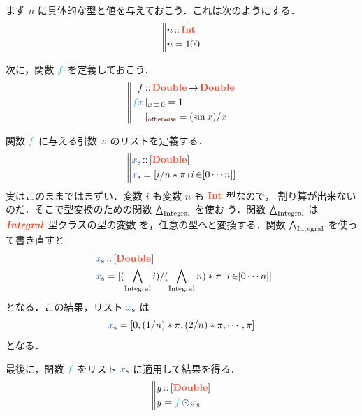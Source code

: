 \documentclass[a5paper,twoside,fleqn,draft]{jsbook}
\begin{document}
まず $n$ に具体的な型と値を与えておこう．これは次のようにする．
\begin{equation}
\left\mBrace
\begin{aligned}
n&\mIn\mIntType\\
n&=100
\end{aligned}
\right.
\end{equation}

次に，関数 $\hFunc{f}$ を定義しておこう．
\begin{equation}
\left\mBrace
\begin{aligned}
f&\mIn\mProjEXP{\mDoubleType}{\mDoubleType}\\
\hFunc{f}\hVar{x}&\hGuard{x\hIfEq0}=1\\
&\hGuard{\hOtherwise}=(\sin x)/x
\end{aligned}
\right.
\end{equation}

関数 $\hFunc{f}$ に与える引数 $\hVar{x}$ のリストを定義する．
\begin{equation*}
  \left\mBrace
  \begin{aligned}
    \mList{x}
    &\mIn{}[\mDoubleType]\\
    \mList{x}
    &=[i/n*\pi\mListComp i\mFrom[0\dotsb n]]
  \end{aligned}
  \right.
\end{equation*}
実はこのままではまずい．変数 $i$ も変数 $n$ も $\mIntType$ 型なので，
割り算が出来ないのだ．そこで型変換のための関数 $\operatorname{\bigtriangleup_\text{Integral}}$ を使お
う．関数 $\operatorname{\bigtriangleup_\text{Integral}}$ は $\mIntegralTypeClass$ 型クラスの型の変数
を，任意の型へと変換する．関数 $\operatorname{\bigtriangleup_\text{Integral}}$ を使って書き直すと
\begin{equation}
  \left\mBrace
  \begin{aligned}
    \mList{x}
    &\mIn{}[\mDoubleType]\\
    \mList{x}
    &=[(\mFromIntegral i)/(\mFromIntegral n)*\pi\mListComp i\mFrom[0\dotsb n]]
  \end{aligned}
  \right.
\end{equation}
となる．この結果，リスト $\mList{x}$ は
\begin{equation}
  \mList{x}
  =[0,(1/n)*\pi,(2/n)*\pi,\dotsb,\pi]
\end{equation}
となる．

最後に，関数 $\hFunc{f}$ をリスト $\mList{x}$ に適用して結果を得る．
\begin{equation}
  \left\mBrace
  \begin{aligned}
    y
    &\mIn{}[\mDoubleType]\\
    y
    &=\hFunc{f}\mMapList\mList{x}
  \end{aligned}
  \right.
\end{equation}
\end{document}
